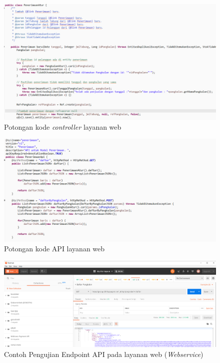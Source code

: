 \begin{enumerate}[a.]
		\begin{figure}[H]
			\center
			\includegraphics [width = 12cm]{gambar/kode/controller-webservice}
			\caption{Potongan kode \textit{controller} layanan web}
			\label{controllerWebservice}
		\end{figure}
	
		\begin{figure}[H]
			\center
			\includegraphics [width = 12cm]{gambar/kode/api-webservice}
			\caption{Potongan kode API layanan web}
			\label{apiWebservice}
		\end{figure}
	
		\begin{figure}[H]
			\center
			\includegraphics [width = 12cm]{gambar/pengujianApi}
			\caption{Contoh Pengujian Endpoint API pada layanan web (\textit{Webservice})}
			\label{pengujianApi}
		\end{figure} 
		

\end{enumerate}
